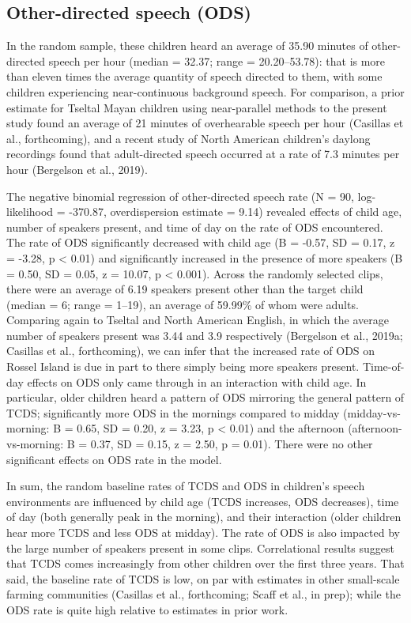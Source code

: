 \documentclass[,man,floatsintext]{apa6}
\begin{document}
\subsection{Other-directed speech
(ODS)}\label{other-directed-speech-ods}

In the random sample, these children heard an average of 35.90 minutes
of other-directed speech per hour (median = 32.37; range =
20.20--53.78): that is more than eleven times the average quantity of
speech directed to them, with some children experiencing near-continuous
background speech. For comparison, a prior estimate for Tseltal Mayan
children using near-parallel methods to the present study found an
average of 21 minutes of overhearable speech per hour (Casillas et al.,
forthcoming), and a recent study of North American children's daylong
recordings found that adult-directed speech occurred at a rate of 7.3
minutes per hour (Bergelson et al., 2019).

The negative binomial regression of other-directed speech rate (N = 90,
log-likelihood = -370.87, overdispersion estimate = 9.14) revealed
effects of child age, number of speakers present, and time of day on the
rate of ODS encountered. The rate of ODS significantly decreased with
child age (B = -0.57, SD = 0.17, z = -3.28, p \textless{} 0.01) and
significantly increased in the presence of more speakers (B = 0.50, SD =
0.05, z = 10.07, p \textless{} 0.001). Across the randomly selected
clips, there were an average of 6.19 speakers present other than the
target child (median = 6; range = 1--19), an average of 59.99\% of whom
were adults. Comparing again to Tseltal and North American English, in
which the average number of speakers present was 3.44 and 3.9
respectively (Bergelson et al., 2019a; Casillas et al., forthcoming), we
can infer that the increased rate of ODS on Rossel Island is due in part
to there simply being more speakers present. Time-of-day effects on ODS
only came through in an interaction with child age. In particular, older
children heard a pattern of ODS mirroring the general pattern of TCDS;
significantly more ODS in the mornings compared to midday
(midday-vs-morning: B = 0.65, SD = 0.20, z = 3.23, p \textless{} 0.01)
and the afternoon (afternoon-vs-morning: B = 0.37, SD = 0.15, z = 2.50,
p = 0.01). There were no other significant effects on ODS rate in the
model.

In sum, the random baseline rates of TCDS and ODS in children's speech
environments are influenced by child age (TCDS increases, ODS
decreases), time of day (both generally peak in the morning), and their
interaction (older children hear more TCDS and less ODS at midday). The
rate of ODS is also impacted by the large number of speakers present in
some clips. Correlational results suggest that TCDS comes increasingly
from other children over the first three years. That said, the baseline
rate of TCDS is low, on par with estimates in other small-scale farming
communities (Casillas et al., forthcoming; Scaff et al., in prep); while
the ODS rate is quite high relative to estimates in prior work.
\end{document}
